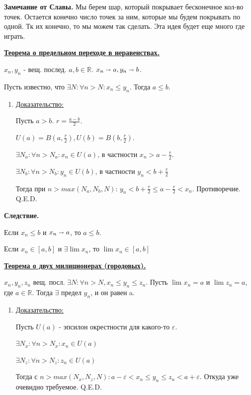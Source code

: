 \documentclass{article}
\newcommand{\thmm}[1]{\underline{\textbf{#1}}}
\begin{document}
\textbf{Замечание от Славы.} Мы берем шар, который покрывает бесконечное кол-во точек. Остается конечно число точек за ним, которые мы будем покрывать по одной. Тк их конечно, то мы можем так сделать. Эта идея будет еще много где играть.

\thmm{Теорема о предельном переходе в неравенствах.}

$x_n,y_n$ - вещ. послед. $a,b \in \mathbb{R}$. $x_n \shortrightarrow a, y_n \shortrightarrow b$.

Пусть известно, что $\exists N:\forall n>N:x_n \leq y_n$. Тогда $a \leq b$.

\begin{enumerate}
    \item[] \uline{Доказательство:}

    Пусть $a>b$. $r = \frac{a-b}{2}$.

    $U(a) = B(a,\frac{r}{2}), U(b) = B(b,\frac{r}{2})$.

    $\exists N_a : \forall n> N_a: x_n \in U(a)$, в частности $x_n > a-\frac{r}{2}$.

    $\exists N_b : \forall n> N_b: y_n \in U(b)$, в частности $y_n < b +\frac{r}{2}$

    Тогда при $n > max(N_a,N_b,N)$: $y_n<b+\frac{r}{2}\leq a-\frac{r}{2} < x_n$. Противоречие. Q.E.D.
\end{enumerate}

\textbf{Следствие.}

Если $x_n \leq b$ и $x_n \shortrightarrow a$, то $a \leq b$.

Если $x_n \in [a,b]$ и $\exists \lim x_n $, то $ \lim x_n \in [a,b]$


\thmm{Теорема о двух милиционерах (городовых).}

$x_n,y_n,z_n$ вещ. посл. $\exists N:\forall n>N, x_n \leq y_n \leq z_n$. Пусть $\lim x_n = a$ и $\lim z_n=a$, где $a \in \mathbb{R}$. Тогда $\exists$ предел $y_n$, и он равен a.

\begin{enumerate}
    \item[] \uline{Доказательство:}

    Пусть $U(a)$ - эпсилон окрестности для какого-то $\varepsilon$.

    $\exists N_x : \forall n> N_x: x_n \in U(a)$

    $\exists N_z : \forall n> N_z: z_n \in U(a)$

    Тогда  с $n > max(N_x, N_z,N): a - \varepsilon < x_n \leq y_n \leq z_n < a + \varepsilon$. Откуда уже очевидно требуемое. Q.E.D.
    
\end{enumerate}
\end{document}
